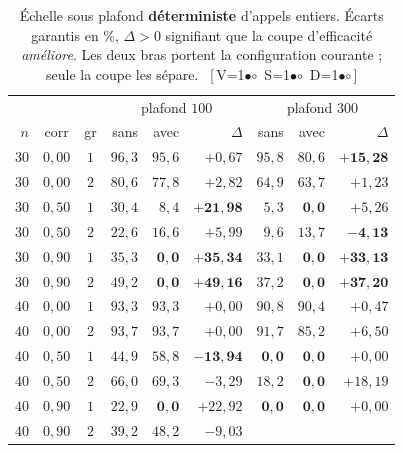 \documentclass[11pt,a4paper]{article}
\theoremstyle{plain}
\theoremstyle{remark}
\newcommand{\cfgm}[1]{\ifnum#1=1$\bullet$\else$\circ$\fi}
\newcommand{\conf}[3]{%
  \textsf{\footnotesize[\,V\cfgm{#1}\ S\cfgm{#2}\ D\cfgm{#3}\,]}}
\begin{document}
\begin{table}[H]
\centering
\caption{Échelle sous plafond \textbf{déterministe} d'appels entiers. Écarts
garantis en \%, $\Delta>0$ signifiant que la coupe d'efficacité
\emph{améliore}. Les deux bras portent la configuration courante ; seule la
coupe les sépare.\ \conf{1}{1}{1}}
\label{tab:echelledeterm}
\setlength{\tabcolsep}{4pt}\small
\begin{tabular}{rcc|rrr|rrr}
\toprule
& & & \multicolumn{3}{c|}{plafond $100$} & \multicolumn{3}{c}{plafond $300$}\\
$n$ & corr & gr & sans & avec & $\Delta$ & sans & avec & $\Delta$\\
\midrule
$30$ & $0{,}00$ & $1$ & $96{,}3$ & $95{,}6$ & $+0{,}67$
                      & $95{,}8$ & $80{,}6$ & $\mathbf{+15{,}28}$\\
$30$ & $0{,}00$ & $2$ & $80{,}6$ & $77{,}8$ & $+2{,}82$
                      & $64{,}9$ & $63{,}7$ & $+1{,}23$\\
$30$ & $0{,}50$ & $1$ & $30{,}4$ & $8{,}4$ & $\mathbf{+21{,}98}$
                      & $5{,}3$ & $\mathbf{0{,}0}$ & $+5{,}26$\\
$30$ & $0{,}50$ & $2$ & $22{,}6$ & $16{,}6$ & $+5{,}99$
                      & $9{,}6$ & $13{,}7$ & $\mathbf{-4{,}13}$\\
$30$ & $0{,}90$ & $1$ & $35{,}3$ & $\mathbf{0{,}0}$ & $\mathbf{+35{,}34}$
                      & $33{,}1$ & $\mathbf{0{,}0}$ & $\mathbf{+33{,}13}$\\
$30$ & $0{,}90$ & $2$ & $49{,}2$ & $\mathbf{0{,}0}$ & $\mathbf{+49{,}16}$
                      & $37{,}2$ & $\mathbf{0{,}0}$ & $\mathbf{+37{,}20}$\\
\midrule
$40$ & $0{,}00$ & $1$ & $93{,}3$ & $93{,}3$ & $+0{,}00$
                      & $90{,}8$ & $90{,}4$ & $+0{,}47$\\
$40$ & $0{,}00$ & $2$ & $93{,}7$ & $93{,}7$ & $+0{,}00$
                      & $91{,}7$ & $85{,}2$ & $+6{,}50$\\
$40$ & $0{,}50$ & $1$ & $44{,}9$ & $58{,}8$ & $\mathbf{-13{,}94}$
                      & $\mathbf{0{,}0}$ & $\mathbf{0{,}0}$ & $+0{,}00$\\
$40$ & $0{,}50$ & $2$ & $66{,}0$ & $69{,}3$ & $-3{,}29$
                      & $18{,}2$ & $\mathbf{0{,}0}$ & $+18{,}19$\\
$40$ & $0{,}90$ & $1$ & $22{,}9$ & $\mathbf{0{,}0}$ & $+22{,}92$
                      & $\mathbf{0{,}0}$ & $\mathbf{0{,}0}$ & $+0{,}00$\\
$40$ & $0{,}90$ & $2$ & $39{,}2$ & $48{,}2$ & $-9{,}03$

\end{tabular}
\end{table}
\end{document}
